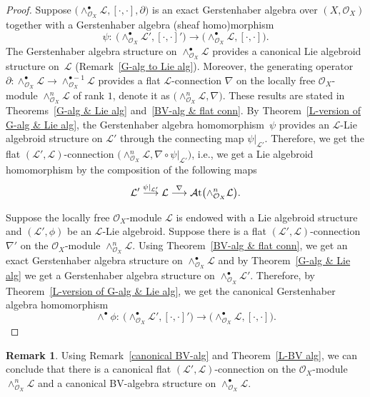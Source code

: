 \documentclass[pdftex]{sigma}
\numberwithin{equation}{section}
\theoremstyle{definition}
\newtheorem{Rem}[Thm]{Remark}
\begin{document}
\begin{proof}
	Suppose $\bigl(\wedge^{\bullet}_{\mathcal{O}_X}\mathcal{L}, [\cdot,\cdot], \partial\bigr)$ is an exact Gerstenhaber algebra over $(X, \mathcal{O}_X)$ together with a Gerstenhaber algebra (sheaf homo)morphism
\[
\psi\colon \ \bigl(\wedge^{\bullet}_{\mathcal{O}_X}\mathcal{L}', [\cdot,\cdot]'\bigr) \rightarrow \bigl(\wedge^{\bullet}_{\mathcal{O}_X}\mathcal{L}, [\cdot,\cdot]\bigr).
\]	
	The Gerstenhaber algebra structure on $\wedge^{\bullet}_{\mathcal{O}_X}\mathcal{L}$ provides a canonical Lie algebroid structure on~$\mathcal{L}$ (Remark~\ref{G-alg to Lie alg}). Moreover, the generating operator $\partial\colon \wedge^{\bullet}_{\mathcal{O}_X}\mathcal{L} \rightarrow \wedge^{\bullet -1}_{\mathcal{O}_X}\mathcal{L}$ provides a flat $\mathcal{L}$\nobreakdash-con\-nec\-tion $\nabla$ on the locally free $\mathcal{O}_X$-module $\wedge^{n}_{\mathcal{O}_X}\mathcal{L}$ of rank $1$, denote it as $\bigl(\wedge^{n}_{\mathcal{O}_X}\mathcal{L}, \nabla\bigr)$. These results are stated in Theorems~\ref{G-alg & Lie alg} and~\ref{BV-alg & flat conn}. By Theorem~\ref{L-version of G-alg & Lie alg}, the Gerstenhaber algebra homomorphism~$\psi$	
	provides an $\mathcal{L}$-Lie algebroid structure on $\mathcal{L}'$ through the connecting map $\psi|_{\mathcal{L}'}$. Therefore, we get the flat $(\mathcal{L}', \mathcal{L})$-connection $\bigl(\wedge^{n}_{\mathcal{O}_X}\mathcal{L}, \nabla \circ \psi|_{\mathcal{L}'}\bigr)$, i.e., we get a Lie algebroid homomorphism by the composition of the following maps
\[
\mathcal{L}' \overset{\psi|_{\mathcal{L}'}}{\longrightarrow} \mathcal{L} \overset{\nabla}{\longrightarrow} \mathcal{A}{\rm t}\bigl(\wedge^{n}_{\mathcal{O}_X}\mathcal{L}\bigr).
\]	
	
Suppose the locally free $\mathcal{O}_X$-module $\mathcal{L}$ is endowed with a Lie algebroid structure and $(\mathcal{L}', \phi)$ be an $\mathcal{L}$-Lie algebroid. Suppose there is a flat $(\mathcal{L}', \mathcal{L})$-connection $\nabla'$ on the $\mathcal{O}_X$-module $\wedge^{n}_{\mathcal{O}_X}\mathcal{L}$. Using Theorem~\ref{BV-alg & flat conn}, we get an exact Gerstenhaber algebra structure on $\wedge^{\bullet}_{\mathcal{O}_X}\mathcal{L}$ and by Theorem~\ref{G-alg & Lie alg} we get a Gerstenhaber algebra structure on $\wedge^{\bullet}_{\mathcal{O}_X}\mathcal{L}'$. Therefore, by Theorem~\ref{L-version of G-alg & Lie alg}, we get the canonical Gerstenhaber algebra homomorphism
\[
\wedge^\bullet \phi\colon \ \bigl(\wedge^{\bullet}_{\mathcal{O}_X}\mathcal{L}', [\cdot,\cdot]'\bigr) \rightarrow \bigl(\wedge^{\bullet}_{\mathcal{O}_X}\mathcal{L}, [\cdot,\cdot]\bigr).\tag*{\qed}
\]\renewcommand{\qed}{}
\end{proof}
 \begin{Rem}
Using Remark~\ref{canonical BV-alg} and Theorem~\ref{L-BV alg}, we can conclude that there is a canonical flat $(\mathcal{L}', \mathcal{L})$-connection on the $\mathcal{O}_X$-module $\wedge^{n}_{\mathcal{O}_X}\mathcal{L}$ and a canonical BV-algebra structure on $\wedge^{\bullet}_{\mathcal{O}_X}\mathcal{L}$.
\end{Rem}
\end{document}
